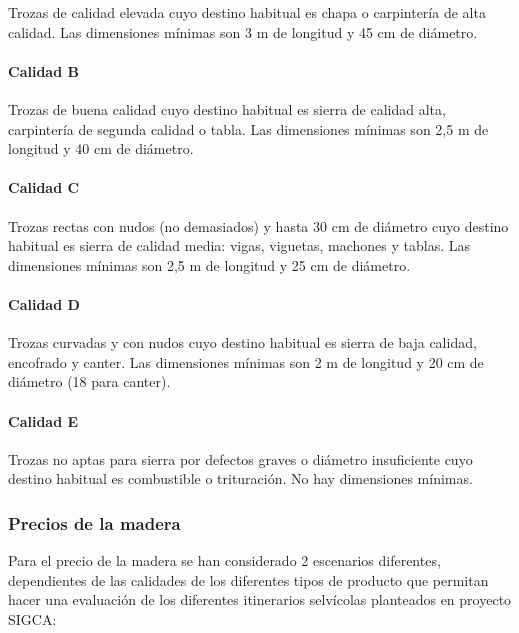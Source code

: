 \documentclass[
]{article}
\begin{document}
Trozas de calidad elevada cuyo destino habitual es chapa o carpintería
de alta calidad. Las dimensiones mínimas son 3 m de longitud y 45 cm de
diámetro.

\hypertarget{calidad-b}{%
\paragraph{Calidad B}\label{calidad-b}}

Trozas de buena calidad cuyo destino habitual es sierra de calidad alta,
carpintería de segunda calidad o tabla. Las dimensiones mínimas son 2,5
m de longitud y 40 cm de diámetro.

\hypertarget{calidad-c}{%
\paragraph{Calidad C}\label{calidad-c}}

Trozas rectas con nudos (no demasiados) y hasta 30 cm de diámetro cuyo
destino habitual es sierra de calidad media: vigas, viguetas, machones y
tablas. Las dimensiones mínimas son 2,5 m de longitud y 25 cm de
diámetro.

\hypertarget{calidad-d}{%
\paragraph{Calidad D}\label{calidad-d}}

Trozas curvadas y con nudos cuyo destino habitual es sierra de baja
calidad, encofrado y canter. Las dimensiones mínimas son 2 m de longitud
y 20 cm de diámetro (18 para canter).

\hypertarget{calidad-e}{%
\paragraph{Calidad E}\label{calidad-e}}

Trozas no aptas para sierra por defectos graves o diámetro insuficiente
cuyo destino habitual es combustible o trituración. No hay dimensiones
mínimas.

\hypertarget{precios-de-la-madera}{%
\subsubsection{Precios de la madera}\label{precios-de-la-madera}}

Para el precio de la madera se han considerado 2 escenarios diferentes,
dependientes de las calidades de los diferentes tipos de producto que
permitan hacer una evaluación de los diferentes itinerarios selvícolas
planteados en proyecto SIGCA:
\end{document}
